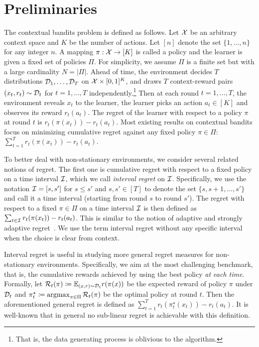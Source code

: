  \section{Preliminaries}\label{sec:setup}


The contextual bandits problem is defined as follows.  Let ${\mathcal{X}}$ be
an arbitrary context space and $K$ be the number of actions.  Let
$[n]$ denote the set $\{1, \ldots, n\}$ for any integer $n$.  A
mapping $\pi: {\mathcal{X}} \rightarrow [K]$ is called a policy and the
learner is given a fixed set of policies $\Pi$.  For simplicity, we
assume $\Pi$ is a finite set but with a large cardinality $N = |\Pi|$.
Ahead of time, the environment decides $T$ distributions ${\mathcal{D}}_1,
\ldots, {\mathcal{D}}_T$ on ${\mathcal{X}} \times [0,1]^K$, and draws $T$
context-reward pairs $(x_t, r_t) \sim {\mathcal{D}}_t$ for $t=1,\ldots, T$
independently.\footnote{That is, the data generating process is
  oblivious to the algorithm.}  Then at each round $t = 1, \ldots, T$,
the environment reveals $x_t$ to the learner, the learner picks an
action $a_t \in [K]$ and observes its reward $r_t(a_t)$.  The regret
of the learner with respect to a policy $\pi$ at round $t$ is
$r_t(\pi(x_t)) - r_t(a_t)$.  Most existing results on contextual
bandits focus on minimizing cumulative regret against any fixed policy
$\pi \in \Pi$: $\sum_{t=1}^T r_t(\pi(x_t)) - r_t(a_t)$.

To better deal with non-stationary environments, we consider several
related notions of regret.  The first one is cumulative regret with
respect to a fixed policy on a time interval ${\mathcal{I}}$, which we call
{\it interval regret} on ${\mathcal{I}}$. Specifically, we use the notation
${\mathcal{I}} = [s, s']$ for $s \leq s'$ and $s, s' \in [T]$ to denote the
set $\{s, s+1, \ldots, s'\}$ and call it a time interval (starting
from round $s$ to round $s'$).  The regret with respect to a fixed
$\pi \in \Pi$ on a time interval ${\mathcal{I}}$ is then defined as $\sum_{t
  \in {\mathcal{I}}} r_t(\pi(x_t)) - r_t(a_t)$. %
This is similar to the notion of adaptive and strongly
adaptive regret~\citep{HazanSe07, DanielyGoSh15}. We use the term
interval regret without any specific interval when the choice is
clear from context.

Interval regret is useful in studying more general regret measures for non-stationary environments.
Specifically, we aim at the most challenging benchmark,
that is, the cumulative rewards achieved by using the best policy {\it at each time}.
Formally, let ${\mathcal{R}}_t(\pi) \coloneqq \mathbb{E}_{(x,r)\sim{\mathcal{D}}_t} r(\pi(x))$ be the expected reward of policy
$\pi$ under ${\mathcal{D}}_t$ and $\pi^\star_t \coloneqq \operatorname*{argmax}_{\pi \in \Pi} {\mathcal{R}}_t(\pi)$ be the optimal policy at round $t$.
Then the aforementioned general regret is defined as $\sum_{t=1}^T r_t(\pi^\star_t(x_t)) - r_t(a_t)$.
It is well-known that in general no sub-linear regret is achievable with this definition. 

